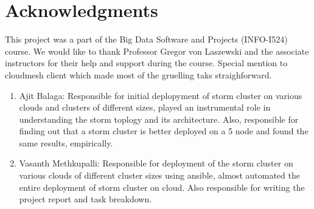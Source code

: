 \documentclass[9pt,twocolumn,twoside]{../../styles/osajnl}
\begin{document}
\section{Acknowledgments}
This project was a part of the Big Data Software and Projects
(INFO-I524) course. We would like to thank Professor Gregor von
Laszewski and the associate instructors for their help and support
during the course. Special mention to cloudmesh client which made most
of the gruelling taks straighforward.



\begin{enumerate}
\section{Work Breakdown}

\item Ajit Balaga: Responsible for initial deplopyment of storm cluster on various clouds and clusters of different sizes, played an instrumental role in understanding the storm toplogy and its architecture. Also, responsible for finding out that a storm cluster is better deployed on a 5 node and found the same results, empirically.

\item Vasanth Methkupalli: Responsible for deployment of the storm cluster on various clouds of different cluster sizes using ansible, almost automated the entire deployment of storm cluster on cloud. Also responsible for writing the project report and task breakdown.

\end{enumerate}
\end{document}
